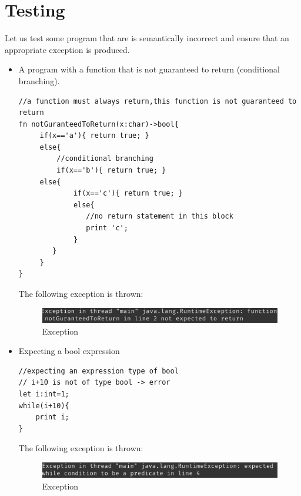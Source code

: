     
    
\section{Testing}

Let us test some program that are is semantically incorrect and ensure that an appropriate exception is produced.

\begin{itemize}
	\item A program with a function that is not guaranteed to return (conditional branching).
	      \begin{lstlisting}[basicstyle=\tiny,caption=Program 4]
//a function must always return,this function is not guaranteed to return
fn notGuranteedToReturn(x:char)->bool{
     if(x=='a'){ return true; }
     else{ 
         //conditional branching 
         if(x=='b'){ return true; }
     else{
             if(x=='c'){ return true; }
             else{
        		//no return statement in this block
        		print 'c';
             }  
        }     
     }
}
	      \end{lstlisting}
	      The following exception is thrown:
	      \begin{figure}[H]
	      	\centering
	      	\includegraphics[scale=0.7]{Task345/images/funcNotExpectedToReturn.png}
	      	\caption{Exception}
	      	\label{fig:exception function not expected to return}
	      \end{figure}
	      	      	          
	      	      	          
	      	      	              
	      	      	          
	\item Expecting a bool expression 
	      \begin{lstlisting}[basicstyle=\tiny,caption=Program 5]
//expecting an expression type of bool
// i+10 is not of type bool -> error
let i:int=1;
while(i+10){
	print i;
}
	      \end{lstlisting}
	      	      	      
	      The following exception is thrown:
	      \begin{figure}[H]
	      	\centering
	      	\includegraphics[scale=0.7]{Task345/images/typeCheckingError.png}
	      	\caption{Exception}
	      	\label{fig:exception function not expected to return}
	      \end{figure}
	      	      	          

\end{itemize}
